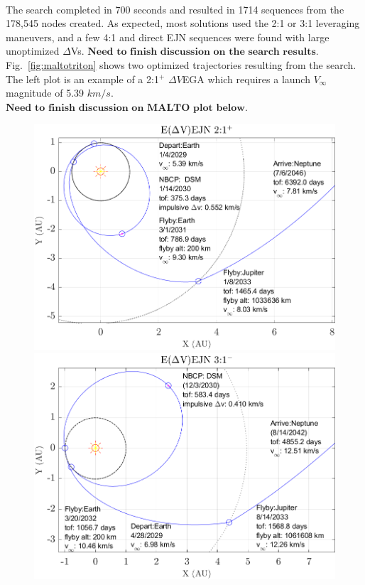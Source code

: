 \documentclass[letterpaper, paper,11pt]{./AAS}		%
\begin{document}
%
%
\\\indent The search completed in 700 seconds and resulted in 1714 sequences from the 178,545 nodes created. As expected, most solutions used the 2:1 or 3:1 leveraging maneuvers, and a few 4:1 and direct EJN sequences were found with large unoptimized $\Delta$Vs.
$\textbf{Need to finish discussion on the search results.}$
\\\indent Fig.~\ref{fig:maltotriton} shows two optimized trajectories resulting from the search. The left plot is an example of a 2:1$^{+}$ $\Delta V$EGA which requires a launch $V_\infty$ magnitude of 5.39 $km/s$.
\\$\textbf{Need to finish discussion on MALTO plot below.}$
%
%
\begin{figure}[ht]
		\centering
		\begin{minipage}{0.50\textwidth}
				\centering
				\includegraphics[width=1.0\textwidth]{./Figures/eejn21plus}
    \end{minipage}\hfill
		\begin{minipage}{0.50\textwidth}
				\centering
				\includegraphics[width=1.0\textwidth]{./Figures/eejn31minus}

\end{minipage}
\end{figure}
\end{document}
